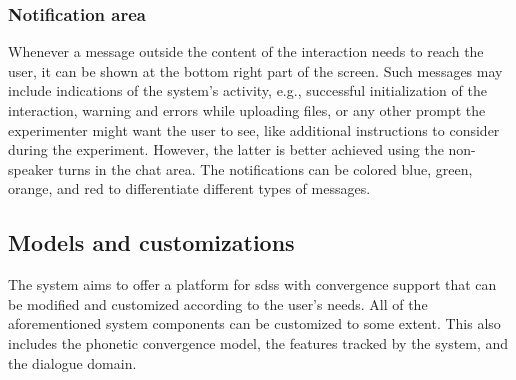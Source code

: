 \subsubsection{Notification area}
\label{subsubsec:notification_area}

Whenever a message outside the content of the interaction needs to reach the user, it can be shown at the bottom right part of the screen.
Such messages may include indications of the system's activity, e.g., successful initialization of the interaction, warning and errors while uploading files, or any other prompt the experimenter might want the user to see, like additional instructions to consider during the experiment.
However, the latter is better achieved using the non-speaker turns in the chat area.
The notifications can be colored blue, green, orange, and red to differentiate different types of messages.

%

\subsection{Models and customizations}
\label{subsec:models_and_cusomizations}

The system aims to offer a platform for \acp{sds} with convergence support that can be modified and customized according to the user's needs.
All of the aforementioned system components can be customized to some extent.
This also includes the phonetic convergence model, the features tracked by the system, and the dialogue domain.

